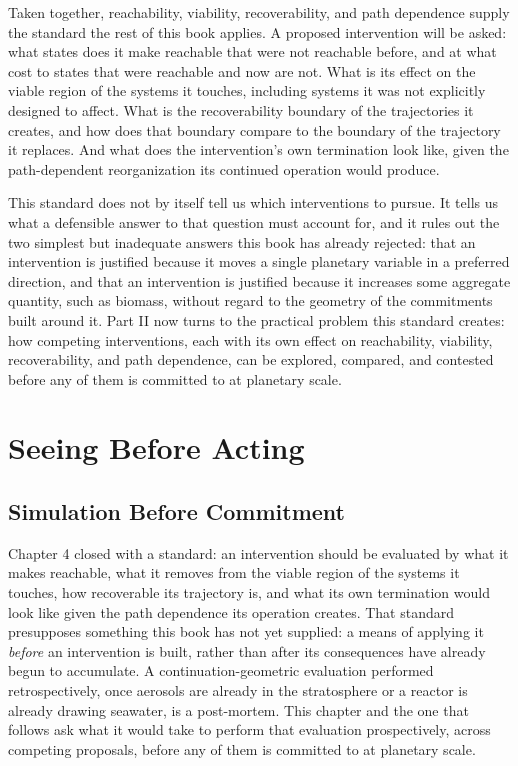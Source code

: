 \documentclass[11pt,oneside]{book}
\begin{document}
Taken together, reachability, viability, recoverability, and path dependence supply the standard the rest of this book applies. A proposed intervention will be asked: what states does it make reachable that were not reachable before, and at what cost to states that were reachable and now are not. What is its effect on the viable region of the systems it touches, including systems it was not explicitly designed to affect. What is the recoverability boundary of the trajectories it creates, and how does that boundary compare to the boundary of the trajectory it replaces. And what does the intervention's own termination look like, given the path-dependent reorganization its continued operation would produce.

This standard does not by itself tell us which interventions to pursue. It tells us what a defensible answer to that question must account for, and it rules out the two simplest but inadequate answers this book has already rejected: that an intervention is justified because it moves a single planetary variable in a preferred direction, and that an intervention is justified because it increases some aggregate quantity, such as biomass, without regard to the geometry of the commitments built around it. Part II now turns to the practical problem this standard creates: how competing interventions, each with its own effect on reachability, viability, recoverability, and path dependence, can be explored, compared, and contested before any of them is committed to at planetary scale.

\part{Seeing Before Acting}

\setcounter{chapter}{5}
\chapter{Simulation Before Commitment}

Chapter 4 closed with a standard: an intervention should be evaluated by what it makes reachable, what it removes from the viable region of the systems it touches, how recoverable its trajectory is, and what its own termination would look like given the path dependence its operation creates. That standard presupposes something this book has not yet supplied: a means of applying it \emph{before} an intervention is built, rather than after its consequences have already begun to accumulate. A continuation-geometric evaluation performed retrospectively, once aerosols are already in the stratosphere or a reactor is already drawing seawater, is a post-mortem. This chapter and the one that follows ask what it would take to perform that evaluation prospectively, across competing proposals, before any of them is committed to at planetary scale.
\end{document}
